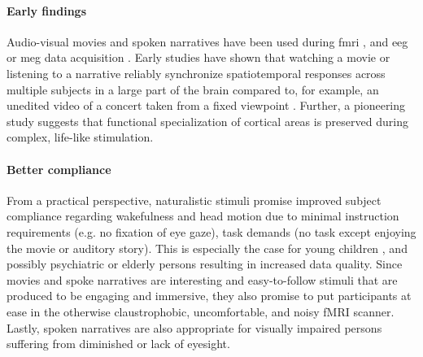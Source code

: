 \paragraph{Early findings}
Audio-visual movies and spoken narratives have been used during \ac{fmri}
\citep[s.][for reviews]{hamilton2018revolution, hasson2008neurocinematics,
sonkusare2019naturalistic, saarimaki2021naturalistic}, and \ac{eeg} or \ac{meg}
data acquisition \citep[s.][for reviews]{alday2019meg, kandylaki2019story}.
%
Early studies have shown that watching a movie \citep{hasson2004intersubject,
hasson2008neurocinematics, hasson2010reliability} or listening to a narrative
\citep{lerner2011topographic, wilson2008beyond} reliably synchronize
spatiotemporal responses across multiple subjects in a large part of the brain
compared to, for example, an unedited video of a concert taken from a fixed
viewpoint \citep{hasson2004intersubject, hasson2008neurocinematics,
hasson2010reliability, lerner2011topographic, wilson2008beyond}.
%
Further, a pioneering study \citep{bartels2004mapping} suggests that functional
specialization of cortical areas is preserved during complex, life-like
stimulation.


\paragraph{Better compliance}
%
From a practical perspective, naturalistic stimuli promise improved subject
compliance regarding wakefulness and head motion due to minimal instruction
requirements (e.g. no fixation of eye gaze), task demands (no task except
enjoying the movie or auditory story).
%
This is especially the case for young children \citep{vanderwal2015inscapes},
and possibly psychiatric \citep{eickhoff2020towards} or elderly persons
resulting in increased data quality.
%
Since movies and spoke narratives are interesting and easy-to-follow stimuli
that are produced to be engaging and immersive, they also promise to put
participants at ease in the otherwise claustrophobic, uncomfortable, and noisy
fMRI scanner.
%
Lastly, spoken narratives are also appropriate for visually impaired persons
suffering from diminished or lack of eyesight.


